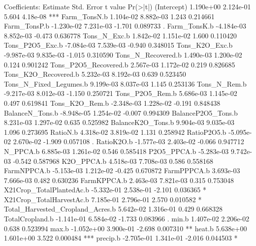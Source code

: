 \documentclass{report}
\begin{document}
\begin{Schunk}
\begin{Soutput}
Coefficients:
                                   Estimate Std. Error t value Pr(>|t|)    
(Intercept)                       1.190e+00  2.124e-01   5.604 4.18e-08 ***
Farm_TonsN.b                      1.104e-02  8.882e-03   1.243 0.214661    
Farm_TonsP.b                     -1.230e-02  7.231e-03  -1.701 0.089733 .  
Farm_TonsK.b                     -4.184e-03  8.852e-03  -0.473 0.636778    
Tons_N_Exc.b                      1.842e-02  1.151e-02   1.600 0.110420    
Tons_P2O5_Exc.b                  -7.084e-03  7.539e-03  -0.940 0.348015    
Tons_K2O_Exc.b                   -9.987e-03  9.835e-03  -1.015 0.310590    
Tons_N_Recovered.b                1.490e-03  1.200e-02   0.124 0.901242    
Tons_P2O5_Recovered.b             2.567e-03  1.172e-02   0.219 0.826685    
Tons_K2O_Recovered.b              5.232e-03  8.192e-03   0.639 0.523450    
Tons_N_Fixed_Legumes.b            9.199e-03  8.037e-03   1.145 0.253136    
Tons_N_Rem.b                     -9.217e-03  8.012e-03  -1.150 0.250721    
Tons_P2O5_Rem.b                   5.686e-03  1.145e-02   0.497 0.619841    
Tons_K2O_Rem.b                   -2.348e-03  1.228e-02  -0.191 0.848438    
BalanceN_Tons.b                  -8.948e-05  1.254e-02  -0.007 0.994309    
BalanceP2O5_Tons.b                8.231e-03  1.297e-02   0.635 0.525982    
BalanceK2O_Tons.b                 9.904e-03  9.035e-03   1.096 0.273695    
RatioN.b                          4.318e-02  3.819e-02   1.131 0.258942    
RatioP2O5.b                      -5.095e-02  2.670e-02  -1.909 0.057108 .  
RatioK2O.b                       -1.577e-03  2.403e-02  -0.066 0.947712    
N_PPCA.b                          6.885e-03  1.261e-02   0.546 0.585418    
P2O5_PPCA.b                      -5.283e-03  9.742e-03  -0.542 0.587968    
K2O_PPCA.b                        4.518e-03  7.708e-03   0.586 0.558168    
FarmNPPCA.b                      -5.153e-03  1.212e-02  -0.425 0.670872    
FarmPPPCA.b                       3.693e-03  7.666e-03   0.482 0.630236    
FarmKPPCA.b                       2.463e-03  7.821e-03   0.315 0.753048    
X21Crop_TotalPlantedAc.b         -5.332e-01  2.538e-01  -2.101 0.036365 *  
X21Crop_TotalHarvestAc.b          7.185e-01  2.796e-01   2.570 0.010582 *  
Total_Harvested_Cropland_Acres.b  5.642e-02  1.316e-01   0.429 0.668328    
TotalCropland.b                  -1.141e-01  6.584e-02  -1.733 0.083966 .  
min.b                             1.407e-02  2.206e-02   0.638 0.523994    
max.b                            -1.052e+00  3.900e-01  -2.698 0.007310 ** 
heat.b                            5.638e+00  1.601e+00   3.522 0.000484 ***
precip.b                         -2.705e-01  1.341e-01  -2.016 0.044503 *  

\end{Soutput}
\end{Schunk}
\end{document}

